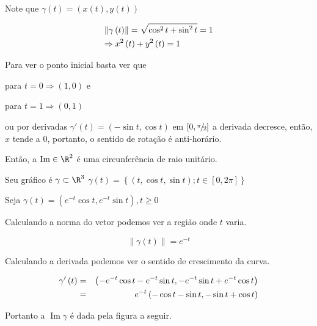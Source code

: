 \documentclass{book}
\begin{document}
\begin{sol}
    Note que $\gamma \left( t \right) = \left( {x\left( t \right),y\left( t \right)} \right)$

\[
\begin{gathered}
      \left\| {\gamma \left( t \right)} \right\| = \sqrt {\cos ^2 t + \sin ^2 t}  = 1 \hfill \\
\Rightarrow x^2 \left( t \right) + y^2 \left( t \right) = 1 \hfill \\
\end{gathered}
\]


Para ver o ponto inicial basta ver que

para $t=0 \Rightarrow \left( {1,0} \right)$ e

para $t=1 \Rightarrow \left( {0,1} \right)$

    ou por derivadas $\gamma '\left( t \right) = \left( { - \sin t,\cos t} \right)$ em $\left[ {0,{\raise0.5ex\hbox{$\scriptstyle \pi $}
\kern-0.1em/\kern-0.15em
    \lower0.25ex\hbox{$\scriptstyle 2$}}} \right]$ a derivada decresce, ent\~ao, $x$ tende a $0$, portanto, o sentido de rota\c c\~ao \'e anti-hor\'ario.

    Ent\~ao, a $\operatorname{Im}  \in \R^2$ \'e uma circunfer\^encia de raio unit\'ario.

    Seu gr\'afico \'e $\gamma  \subset \R^3$ $\gamma \left( t \right)= \left\{ {\left( {t,\cos t,\sin t} \right);t \in \left[ {0,2\pi } \right]} \right\}$

\end{sol}

\begin{ex}
    Seja $\gamma \left( t \right) = \left( {e^{ - t} \cos t,e^{ - t} \sin t} \right),t \geqslant 0$
\end{ex}

\begin{sol}
Calculando a norma do vetor podemos ver a regi\~ao onde $t$ varia.

\[
\left\| {\gamma \left( t \right)} \right\| = e^{ - t}
\]

Calculando a derivada podemos ver o sentido de crescimento da curva.

\begin{eqnarray*}
      \gamma '\left( t \right) &=& \left( { - e^{ - t} \cos t - e^{ - t} \sin t, - e^{ - t} \sin t + e^{ - t} \cos t} \right) \hfill \\
       &=& e^{ - t} \left( { - \cos t - \sin t, - \sin t + \cos t} \right) \hfill \\
\end{eqnarray*}

Portanto a $\operatorname{Im} \gamma$ \'e dada pela figura a seguir.



\end{sol}
\end{document}
